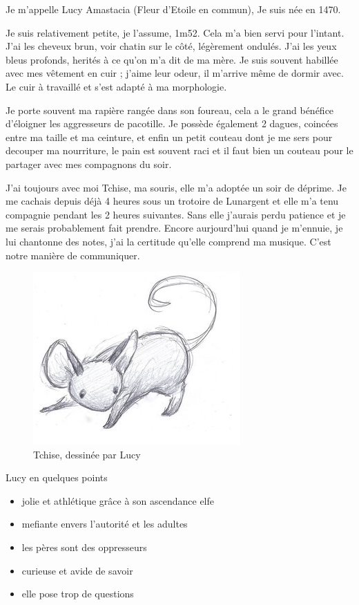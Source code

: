 \documentclass[10pt,a4paper,twoside,twocolumn,openany]{book}
\begin{document}
Je m'appelle Lucy Amastacia (Fleur d'Etoile en commun), Je suis née en 1470.

Je suis relativement petite, je l'assume, 1m52. Cela m'a bien servi
pour l'intant. J'ai les cheveux brun, voir chatin sur le côté, légèrement
ondulés. J'ai les yeux bleus profonds, herités à ce qu'on m'a dit de ma mère.
Je suis souvent habillée avec mes vêtement en cuir ; j'aime leur odeur, il m'arrive
même de dormir avec. Le cuir à travaillé et s'est adapté à ma morphologie.

Je porte souvent ma rapière rangée dans son foureau, cela a le grand bénéfice d'éloigner
les aggresseurs de pacotille. Je possède également 2 dagues, coincées
entre ma taille et ma ceinture, et enfin un petit couteau dont je me sers pour
decouper ma nourriture, le pain est souvent raci et il faut bien un couteau pour le partager
avec mes compagnons du soir.

J'ai toujours avec moi Tchise, ma souris, elle m'a adoptée un soir de déprime. Je me cachais
depuis déjà 4 heures sous un trotoire de Lunargent et elle m'a tenu compagnie pendant
les 2 heures suivantes. Sans elle j'aurais perdu patience et je me serais probablement
fait prendre. Encore aurjourd'hui quand je m'ennuie, je lui chantonne des notes, j'ai la
certitude qu'elle comprend ma musique. C'est notre manière de communiquer.

\begin{figure}[!h]
\centering
\includegraphics[scale=1]{tchise.png}
\caption*{Tchise, dessinée par Lucy}
\end{figure}

\begin{commentbox}{Lucy en quelques points}

\begin{itemize}
\item jolie et athlétique grâce à son ascendance elfe
\item mefiante envers l'autorité et les adultes
\item les pères sont des oppresseurs
\item curieuse et avide de savoir
\item elle pose trop de questions
\end{itemize}

\end{commentbox}
\end{document}
